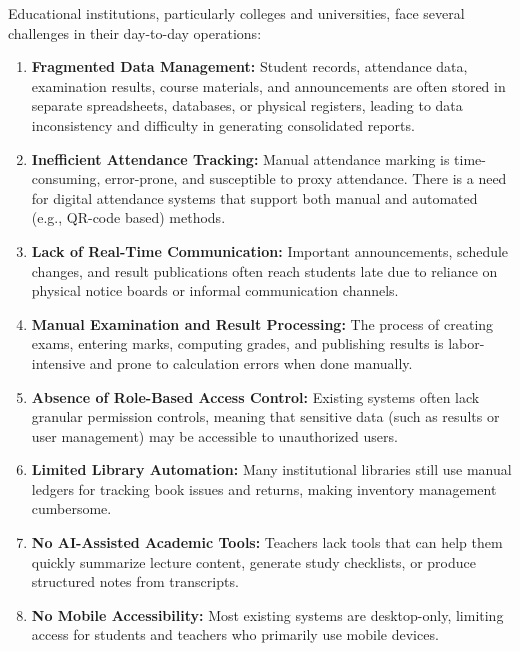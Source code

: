Educational institutions, particularly colleges and universities, face several challenges in their day-to-day operations:

\begin{enumerate}[label=\arabic*., leftmargin=2em]
    \item \textbf{Fragmented Data Management:} Student records, attendance data, examination results, course materials, and announcements are often stored in separate spreadsheets, databases, or physical registers, leading to data inconsistency and difficulty in generating consolidated reports.
    
    \item \textbf{Inefficient Attendance Tracking:} Manual attendance marking is time-consuming, error-prone, and susceptible to proxy attendance. There is a need for digital attendance systems that support both manual and automated (e.g., QR-code based) methods.
    
    \item \textbf{Lack of Real-Time Communication:} Important announcements, schedule changes, and result publications often reach students late due to reliance on physical notice boards or informal communication channels.
    
    \item \textbf{Manual Examination and Result Processing:} The process of creating exams, entering marks, computing grades, and publishing results is labor-intensive and prone to calculation errors when done manually.
    
    \item \textbf{Absence of Role-Based Access Control:} Existing systems often lack granular permission controls, meaning that sensitive data (such as results or user management) may be accessible to unauthorized users.
    
    \item \textbf{Limited Library Automation:} Many institutional libraries still use manual ledgers for tracking book issues and returns, making inventory management cumbersome.
    
    \item \textbf{No AI-Assisted Academic Tools:} Teachers lack tools that can help them quickly summarize lecture content, generate study checklists, or produce structured notes from transcripts.
    
    \item \textbf{No Mobile Accessibility:} Most existing systems are desktop-only, limiting access for students and teachers who primarily use mobile devices.
\end{enumerate}

